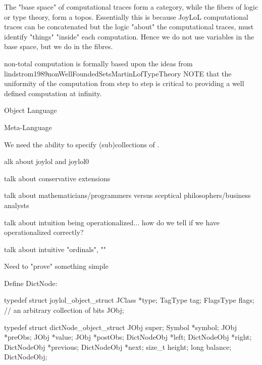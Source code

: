 The "base space" of computational traces form a category, while the fibers 
of logic or type theory, form a topos. Essentially this is because JoyLoL 
computational traces can be concatenated but the logic "about" the 
computational traces, must identify "things" "inside" each computation. 
Hence we do not use variables in the base space, but we do in the fibres. 

non-total computation is formally based upon the ideas from 
lindstrom1989nonWellFoundedSetsMartinLofTypeTheory NOTE that the 
uniformity of the computation from step to step is critical to providing a 
well defined computation at infinity. 

Object Language

Meta-Language

We need the ability to specify (sub)collections of . 

\subject[title=A Tale of many languages]

talk about joylol and joylol0

talk about conservative extensions

talk about mathematicians/programmers versus sceptical 
philosophers/business analysts

talk about intuition being operationalized... how do we tell if we have 
operationalized correctly? 

talk about intuitive "ordinals", ""

Need to "prove" something simple


Define DictNode:

\starttyping
typedef struct joylol_object_struct {
  JClass    *type;
  TagType    tag;
  FlagsType  flags; // an arbitrary collection of bits
} JObj;

typedef struct dictNode_object_struct {
  JObj         super;
  Symbol      *symbol;
  JObj        *preObs;
  JObj        *value;
  JObj        *postObs;
  DictNodeObj *left;
  DictNodeObj *right;
  DictNodeObj *previous;
  DictNodeObj *next;
  size_t       height;
  long         balance;
} DictNodeObj;
\stoptyping


